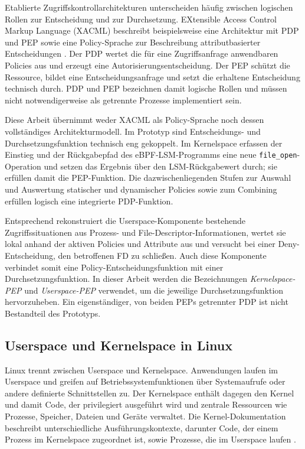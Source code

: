 Etablierte Zugriffskontrollarchitekturen unterscheiden häufig zwischen logischen Rollen zur Entscheidung und zur Durchsetzung.
EXtensible Access Control Markup Language (XACML) beschreibt beispielsweise eine Architektur mit PDP und PEP sowie eine Policy-Sprache zur Beschreibung attributbasierter Entscheidungen \citep{oasisXacml30}.
Der PDP wertet die für eine Zugriffsanfrage anwendbaren Policies aus und erzeugt eine Autorisierungsentscheidung.
Der PEP schützt die Ressource, bildet eine Entscheidungsanfrage und setzt die erhaltene Entscheidung technisch durch.
PDP und PEP bezeichnen damit logische Rollen und müssen nicht notwendigerweise als getrennte Prozesse implementiert sein.

Diese Arbeit übernimmt weder XACML als Policy-Sprache noch dessen vollständiges Architekturmodell.
Im Prototyp sind Entscheidungs- und Durchsetzungsfunktion technisch eng gekoppelt.
Im Kernelspace erfassen der Einstieg und der Rückgabepfad des eBPF-LSM-Programms eine neue \texttt{file\_open}-Operation und setzen das Ergebnis über den LSM-Rückgabewert durch; sie erfüllen damit die PEP-Funktion.
Die dazwischenliegenden Stufen zur Auswahl und Auswertung statischer und dynamischer Policies sowie zum Combining erfüllen logisch eine integrierte PDP-Funktion.

Entsprechend rekonstruiert die Userspace-Komponente bestehende Zugriffssituationen aus Prozess- und File-Descriptor-Informationen, wertet sie lokal anhand der aktiven Policies und Attribute aus und versucht bei einer Deny-Entscheidung, den betroffenen FD zu schließen.
Auch diese Komponente verbindet somit eine Policy-Entscheidungsfunktion mit einer Durchsetzungsfunktion.
In dieser Arbeit werden die Bezeichnungen \emph{Kernelspace-PEP} und \emph{Userspace-PEP} verwendet, um die jeweilige Durchsetzungsfunktion hervorzuheben.
Ein eigenständiger, von beiden PEPs getrennter PDP ist nicht Bestandteil des Prototyps.

\subsection{Userspace und Kernelspace in Linux}
Linux trennt zwischen Userspace und Kernelspace. 
Anwendungen laufen im Userspace und greifen auf Betriebssystemfunktionen über Systemaufrufe oder andere definierte Schnittstellen zu. 
Der Kernelspace enthält dagegen den Kernel und damit Code, der privilegiert ausgeführt wird und zentrale Ressourcen wie Prozesse, Speicher, Dateien und Geräte verwaltet. 
Die Kernel-Dokumentation beschreibt unterschiedliche Ausführungskontexte, darunter Code, der einem Prozess im Kernelspace zugeordnet ist, sowie Prozesse, die im Userspace laufen \citep{linuxKernelHacking}.

